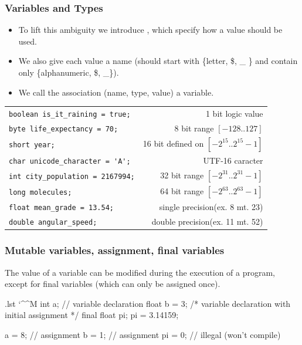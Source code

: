 \documentclass[10pt, handout]{beamer}
\makeatletter
\newenvironment{code}{%
  \begingroup
  \@bsphack
  \immediate\openout\lstvrb@out\jobname.lst
  \let\do\@makeother\dospecials\catcode`\^^M\active
  \def\verbatim@processline{%
    \immediate\write\lstvrb@out{\the\verbatim@line}}%
  \verbatim@start}{%
  \immediate\closeout\lstvrb@out
  \@esphack
  \endgroup

  \begin{alertblock}{}
    
  \end{alertblock}}
\makeatother
\begin{document}
\begin{frame}[fragile]
  \frametitle{Variables and Types}
  \begin{itemize}
  \item
  To lift this ambiguity we introduce ,
  which specify how a value should be used.
  \item
  We also give each value a name (should start with \{letter, \$, \_ \} and contain only \{alphanumeric, \$, \_\}).
  \item
  We call the association (name, type, value) a variable.
  \end{itemize}

  \begin{example}
   \begin{longtable}{l|r}
   \lstinline!boolean is_it_raining = true;! & 1 bit logic value\\
   \pause
   \lstinline!byte life_expectancy = 70;! & 8 bit range $[-128..127]$ \\
   \lstinline!short year;! & 16 bit defined on $[-2^{15}..2^{15}-1]$ \\
   \lstinline!char unicode_character = 'A';! & UTF-16 caracter \\
   \pause
   \lstinline!int city_population = 2167994;! & 32 bit range $[-2^{31}..2^{31}-1]$ \\
   \pause
   \lstinline!long molecules;! &  64 bit range $[-2^{63}..2^{63}-1]$ \\
   \hline
   \pause
   \lstinline!float mean_grade = 13.54;! & single precision(ex. 8 mt. 23) \\
   \lstinline!double angular_speed;! & double precision(ex. 11 mt. 52) \\
  \end{longtable}
\end{example}
\end{frame}


\begin{frame}[fragile]
  \frametitle{Mutable variables, assignment, final variables}

  The value of a variable can be modified during the execution of a program,
  except for final variables (which can only be assigned once).

  \begin{code}
int a; // variable declaration
float b = 3; /* variable declaration with
                initial assignment */
final float pi;
pi = 3.14159;

a = 8;  // assignment
b = 1;  // assignment
pi = 0; // illegal (won't compile)
  \end{code}
\end{frame}
\end{document}
